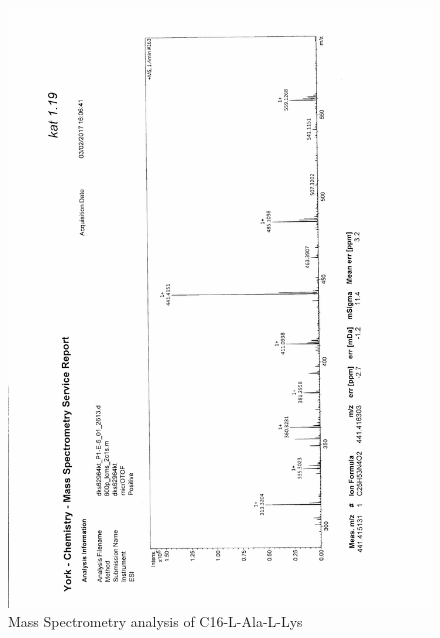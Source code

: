 \begin{figure}[ht!]
\centering
\includegraphics[scale=0.75]{Mass_Spec/KAT1_19.PDF}
\caption{Mass Spectrometry analysis of C16-L-Ala-L-Lys}
\end{figure}
